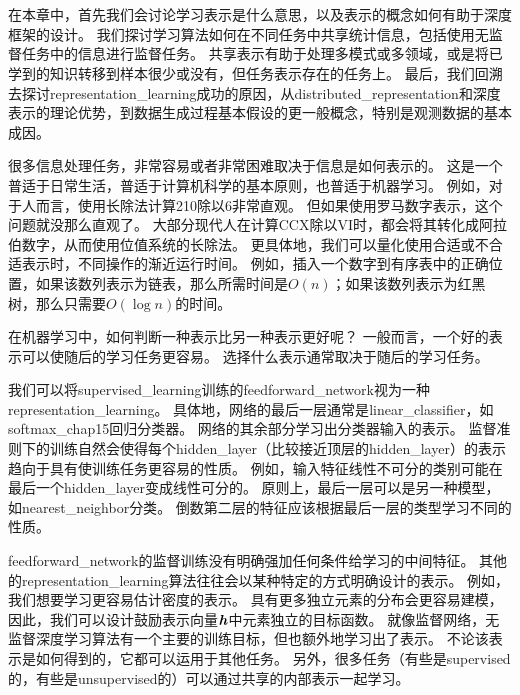 \chapter{}
\label{chap:representation_learning}
在本章中，首先我们会讨论学习表示是什么意思，以及表示的概念如何有助于深度框架的设计。
我们探讨学习算法如何在不同任务中共享统计信息，包括使用无监督任务中的信息进行监督任务。
共享表示有助于处理多模式或多领域，或是将已学到的知识转移到样本很少或没有，但任务表示存在的任务上。
最后，我们回溯去探讨\gls{representation_learning}成功的原因，从\gls{distributed_representation}\citep{Hinton-et-al-PDP1986}和深度表示的理论优势，到数据生成过程基本假设的更一般概念，特别是观测数据的基本成因。


很多信息处理任务，非常容易或者非常困难取决于信息是如何表示的。
这是一个普适于日常生活，普适于计算机科学的基本原则，也普适于机器学习。
例如，对于人而言，使用长除法计算210除以6非常直观。
但如果使用罗马数字表示，这个问题就没那么直观了。
大部分现代人在计算CCX除以VI时，都会将其转化成阿拉伯数字，从而使用位值系统的长除法。
更具体地，我们可以量化使用合适或不合适表示时，不同操作的渐近运行时间。
例如，插入一个数字到有序表中的正确位置，如果该数列表示为链表，那么所需时间是$O(n)$；如果该数列表示为红黑树，那么只需要$O(\log n)$的时间。


在机器学习中，如何判断一种表示比另一种表示更好呢？
一般而言，一个好的表示可以使随后的学习任务更容易。
选择什么表示通常取决于随后的学习任务。


我们可以将\gls{supervised_learning}训练的\gls{feedforward_network}视为一种\gls{representation_learning}。
具体地，网络的最后一层通常是\gls{linear_classifier}，如\gls{softmax_chap15}回归分类器。
网络的其余部分学习出分类器输入的表示。
监督准则下的训练自然会使得每个\gls{hidden_layer}（比较接近顶层的\gls{hidden_layer}）的表示趋向于具有使训练任务更容易的性质。
例如，输入特征线性不可分的类别可能在最后一个\gls{hidden_layer}变成线性可分的。
原则上，最后一层可以是另一种模型，如\gls{nearest_neighbor}分类\citep{SalakhutdinovR2007-small}。
倒数第二层的特征应该根据最后一层的类型学习不同的性质。


\gls{feedforward_network}的监督训练没有明确强加任何条件给学习的中间特征。
其他的\gls{representation_learning}算法往往会以某种特定的方式明确设计的表示。
例如，我们想要学习更容易估计密度的表示。
具有更多独立元素的分布会更容易建模，因此，我们可以设计鼓励表示向量$\boldsymbol{\mathit{h}}$中元素独立的目标函数。
就像监督网络，无监督深度学习算法有一个主要的训练目标，但也额外地学习出了表示。
不论该表示是如何得到的，它都可以运用于其他任务。
另外，很多任务（有些是\gls{supervised}的，有些是\gls{unsupervised}的）可以通过共享的内部表示一起学习。


